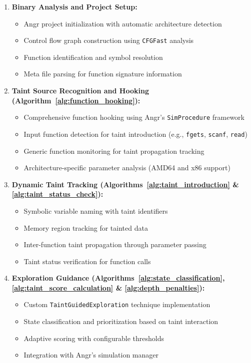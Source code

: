 \begin{enumerate}
    \item \textbf{Binary Analysis and Project Setup:}
    \begin{itemize}
        \item Angr project initialization with automatic architecture detection
        \item Control flow graph construction using \texttt{CFGFast} analysis
        \item Function identification and symbol resolution
        \item Meta file parsing for function signature information
    \end{itemize}

    \item \textbf{Taint Source Recognition and Hooking (Algorithm~\ref{alg:function_hooking}):}
    \begin{itemize}
        \item Comprehensive function hooking using Angr's \texttt{SimProcedure} framework
        \item Input function detection for taint introduction (e.g., \texttt{fgets}, \texttt{scanf}, \texttt{read})
        \item Generic function monitoring for taint propagation tracking
        \item Architecture-specific parameter analysis (AMD64 and x86 support)
    \end{itemize}

    \item \textbf{Dynamic Taint Tracking (Algorithms~\ref{alg:taint_introduction} \& \ref{alg:taint_status_check}):}
    \begin{itemize}
        \item Symbolic variable naming with taint identifiers
        \item Memory region tracking for tainted data
        \item Inter-function taint propagation through parameter passing
        \item Taint status verification for function calls
    \end{itemize}

    \item \textbf{Exploration Guidance (Algorithms~\ref{alg:state_classification}, \ref{alg:taint_score_calculation} \& \ref{alg:depth_penalties}):}
    \begin{itemize}
        \item Custom \texttt{TaintGuidedExploration} technique implementation
        \item State classification and prioritization based on taint interaction
        \item Adaptive scoring with configurable thresholds
        \item Integration with Angr's simulation manager
    \end{itemize}


\end{enumerate}
